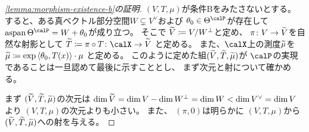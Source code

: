 \documentclass[report]{jlreq}
\begin{document}
\begin{proof}[\cref{lemma:morphism-existence-b}の証明]
    $(V, T, \mu)$が条件Bをみたさないとする。
    すると、ある真ベクトル部分空間$W \subsetneq V^\vee$および
    $\theta_0 \in \Theta^\calP$が存在して
    $\aspan\Theta^\calP = W + \theta_0$が成り立つ。
    そこで
    $\widetilde{V} \coloneqq V / W^\perp$と定め、
    $\pi \colon V \to \widetilde{V}$を自然な射影として
    $\wt{T} \coloneqq \pi \circ T \colon \calX \to \wt{V}$
    と定める。
    また、$\calX$上の測度$\widetilde{\mu}$を
    $\widetilde{\mu} \coloneqq \exp\left\langle{\theta_0},{T(x)}\right\rangle \cdot \mu$
    と定める。
    このように定めた組$(\widetilde{V}, \widetilde{T}, \widetilde{\mu})$が
    $\calP$の実現であることは一旦認めて最後に示すこととし、
    まず次元と射について確かめる。

    まず
    $(\widetilde{V}, \widetilde{T}, \widetilde{\mu})$の次元は
    $\dim \widetilde{V} = \dim V - \dim W^\perp = \dim W < \dim V^\vee = \dim V$
    より
    $(V, T, \mu)$の次元よりも小さい。
    また、
    $(\pi, 0)$は明らかに
    $(V, T, \mu)$から$(\widetilde{V}, \widetilde{T}, \widetilde{\mu})$への射を与える。


\end{proof}
\end{document}
